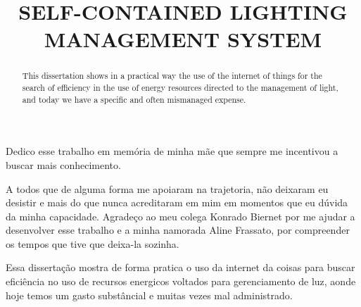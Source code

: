 \documentclass[openright]{normas-utf-tex} %
\title{\MakeUppercase{Self-contained lighting management system}} %
\begin{document}
\capa %
\folhaderosto %

\fichacatpgbib{\pageref{bibstart}-\pageref{bibend}}
\fichacat



\begin{dedicatoria}
Dedico esse trabalho em memória de minha mãe que sempre me incentivou a buscar mais conhecimento.
\end{dedicatoria}

\begin{agradecimentos}
A todos que de alguma forma me apoiaram na trajetoria, não deixaram eu desistir e mais do que nunca acreditaram em mim em momentos que eu dúvida da minha capacidade.
Agradeço ao meu colega Konrado Biernet por me ajudar a desenvolver esse trabalho e a minha namorada Aline Frassato, por compreender os tempos que tive que deixa-la sozinha.
\end{agradecimentos}

\begin{resumo}
Essa dissertação mostra de forma pratica o uso da internet da coisas para buscar eficiência no uso de recursos energicos voltados para gerenciamento de luz, aonde hoje temos um gasto substâncial e muitas vezes mal administrado.
\end{resumo}

\begin{abstract}
This dissertation shows in a practical way the use of the internet of things for the search of efficiency in the use of energy resources directed to the management of light, and today we have a specific and often mismanaged expense.
\end{abstract}

\sumario %


\setcounter{page}{12}

\end{document}
